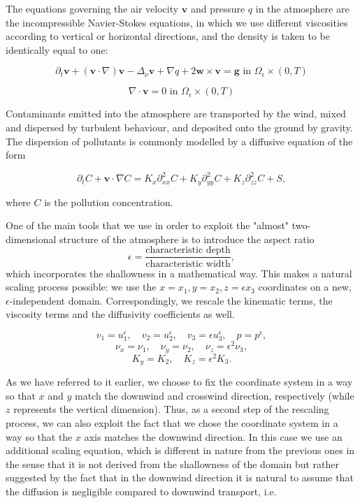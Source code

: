 \documentclass{article}
\begin{document}
The equations governing the air velocity $\mathbf{v}$ and pressure $q$ in the atmosphere are the incompressible Navier-Stokes equations, in which we use different viscosities according to vertical or horizontal directions, and the density is taken to be identically equal to one:

\begin{equation}
  \partial_t \mathbf{v} + (\mathbf{v} \cdot \nabla)\mathbf{v} -\Delta_{\nu} \mathbf{v} + \nabla q + 2 \mathbf{w} \times \mathbf{v}= \mathbf{g} \text{ in } \Omega_{\epsilon} \times (0,T)
\end{equation}
    
\begin{equation}
  \nabla \cdot \mathbf{v} = 0 \text{ in } \Omega_{\epsilon} \times (0,T)
\end{equation}

Contaminants emitted into the atmosphere are transported by the wind, mixed and dispersed by turbulent behaviour, and deposited onto the ground by gravity. The dispersion of pollutants is commonly modelled by a diffusive equation of the form
    
\begin{equation} \label{diffusive}
  \partial_t C + \mathbf{v} \cdot \nabla C = K_x \partial_{xx} ^2 C + K_y  \partial_{yy} ^2  C + K_z  \partial_{zz} ^2  C + S,
\end{equation}

where $C$ is the pollution concentration.

One of the main tools that we use in order to exploit the "almost" two-dimensional structure of the atmosphere is to introduce the aspect ratio $$\epsilon = \frac{\text{characteristic depth}}{\text{characteristic width}},$$ which incorporates the shallowness in a mathematical way. This makes a natural scaling process possible: we use the $x=x_1, y=x_2, z=\epsilon x_3$ coordinates on a new, $\epsilon$-independent domain. Correspondingly, we rescale the kinematic terms, the viscosity terms and the diffusivity coefficients as well.

    \[v_1 = u_1^{\epsilon}, \quad v_2 = u_2^{\epsilon}, \quad v_3 = \epsilon u_3^{\epsilon}, \quad p = p^{\epsilon}, \]
    \[\nu_x = \nu_1, \quad \nu_y = \nu_2 , \quad \nu_z = \epsilon ^ 2\nu_3, \]
    \[ K_y = K_2, \quad K_z = \epsilon ^ 2 K_3. \]
    
    As we have referred to it earlier, we choose to fix the coordinate system in a way so that $x$ and $y$ match the downwind and crosswind direction, respectively (while $z$ represents the vertical dimension). Thus, as a second step of the rescaling process, we can also exploit the fact that we chose the coordinate system in a way so that the $x$ axis matches the downwind direction. In this case we use an additional scaling equation, which is different in nature from the previous ones in the sense that it is not derived from the shallowness of the domain but rather suggested by the fact that in the downwind direction it is natural to assume that the diffusion is negligible compared to downwind transport, i.e.
    
\end{document}

